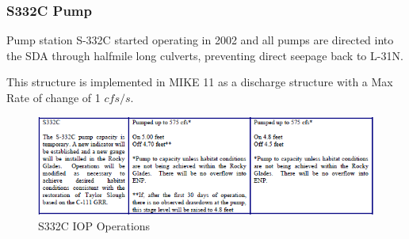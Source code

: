 %
%


\clearpage
\subsubsection{S332C Pump}
Pump station S-332C started operating in 2002 and all pumps are directed into the SDA through halfmile long culverts, preventing direct seepage back to L-31N.

This structure is implemented in MIKE 11 as a discharge structure with a Max Rate of change of 1 $cfs/s$.


\begin{figure}[!h]
  \begin{center}
  \includegraphics[width=6.5in]{../figs/S332C_IOPops.png}
  \caption{S332C IOP Operations}
  \label{fig:S332Ciop}
  \end{center}
\end{figure}


